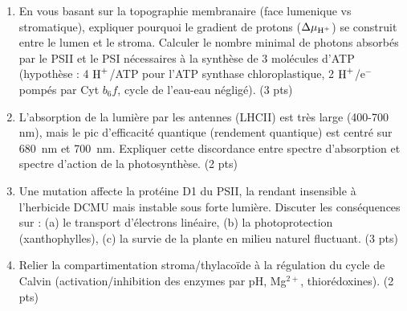 \documentclass[11pt]{article}
\begin{document}
\begin{exercice}
\begin{enumerate}
    \item En vous basant sur la topographie membranaire (face lumenique vs stromatique), expliquer pourquoi le gradient de protons ($\Delta \mu_{\ce{H+}}$) se construit entre le lumen et le stroma. Calculer le nombre minimal de photons absorbés par le PSII et le PSI nécessaires à la synthèse de 3 molécules d'ATP (hypothèse : 4 $\ce{H+}$/ATP pour l'ATP synthase chloroplastique, 2 $\ce{H+}$/e$^-$ pompés par Cyt $b_6f$, cycle de l'eau-eau négligé). (3 pts)
    \item L'absorption de la lumière par les antennes (LHCII) est très large (400-700 nm), mais le pic d'efficacité quantique (rendement quantique) est centré sur \qty{680}{\nano\meter} et \qty{700}{\nano\meter}. Expliquer cette discordance entre spectre d'absorption et spectre d'action de la photosynthèse. (2 pts)
    \item Une mutation affecte la protéine D1 du PSII, la rendant insensible à l'herbicide DCMU mais instable sous forte lumière. Discuter les conséquences sur : (a) le transport d'électrons linéaire, (b) la photoprotection (xanthophylles), (c) la survie de la plante en milieu naturel fluctuant. (3 pts)
    \item Relier la compartimentation stroma/thylacoïde à la régulation du cycle de Calvin (activation/inhibition des enzymes par pH, Mg$^{2+}$, thiorédoxines). (2 pts)
\end{enumerate}
\end{exercice}
\end{document}
